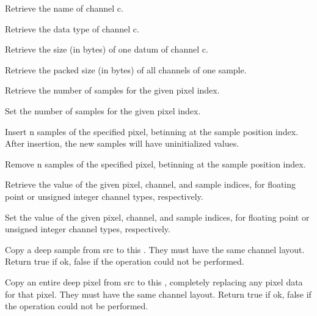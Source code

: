 Retrieve the name of channel {\cf c}.
\apiend

Retrieve the data type of channel {\cf c}.
\apiend

Retrieve the size (in bytes) of one datum of channel {\cf c}.
\apiend

Retrieve the packed size (in bytes) of all channels of one sample.
\apiend

Retrieve the number of samples for the given pixel index.
\apiend

Set the number of samples for the given pixel index.
\apiend

Insert {\cf n} samples of the specified pixel, betinning at the sample
position index. After insertion, the new samples will have uninitialized
values.
\apiend

Remove {\cf n} samples of the specified pixel, betinning at the sample
position index.
\apiend

Retrieve the value of the given pixel, channel, and sample indices, for
floating point or unsigned integer channel types, respectively.
\apiend

Set the value of the given pixel, channel, and sample indices, for
floating point or unsigned integer channel types, respectively.
\apiend

Copy a deep sample from {\cf src} to this \DeepData. They must have the same
channel layout. Return {\cf true} if ok, {\cf false} if the operation could
not be performed.
\apiend

Copy an entire deep pixel from {\cf src} to this \DeepData, completely
replacing any pixel data for that pixel. They must have the same channel
layout. Return {\cf true} if ok, {\cf false} if the operation could not be
performed.
\apiend

